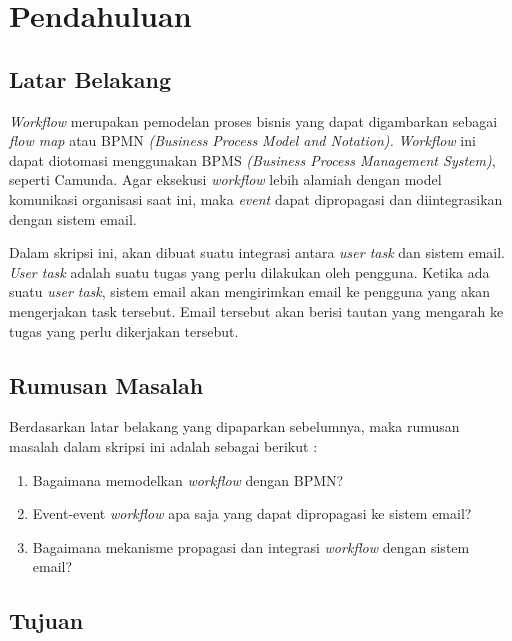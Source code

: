 \chapter{Pendahuluan}
\label{chap:intro}
   
\section{Latar Belakang}
\label{sec:label}

\textit{Workflow} merupakan pemodelan proses bisnis yang dapat digambarkan sebagai \textit{flow map} atau BPMN \textit{(Business Process Model and Notation).} \textit{Workflow} ini dapat diotomasi menggunakan BPMS \textit{(Business Process Management System)}, seperti Camunda. Agar eksekusi \textit{workflow} lebih alamiah dengan model komunikasi organisasi saat ini, maka \textit{event} dapat dipropagasi dan diintegrasikan dengan sistem email. 

Dalam skripsi ini, akan dibuat suatu integrasi antara \textit{user task} dan sistem email. \textit{User task} adalah suatu tugas yang perlu dilakukan oleh pengguna. Ketika ada suatu \textit{user task}, sistem email akan mengirimkan email ke pengguna yang akan mengerjakan task tersebut. Email tersebut akan berisi tautan yang mengarah ke tugas yang perlu dikerjakan tersebut.



\section{Rumusan Masalah}
\label{sec:rumusan}

Berdasarkan latar belakang yang dipaparkan sebelumnya, maka rumusan masalah dalam skripsi ini adalah sebagai berikut :
\begin{enumerate}
	\item Bagaimana memodelkan \textit{workflow} dengan BPMN?
	\item Event-event \textit{workflow} apa saja yang dapat dipropagasi ke sistem email?
	\item Bagaimana mekanisme propagasi dan integrasi \textit{workflow} dengan sistem email?
\end{enumerate} 




\section{Tujuan}
\label{sec:tujuan}

